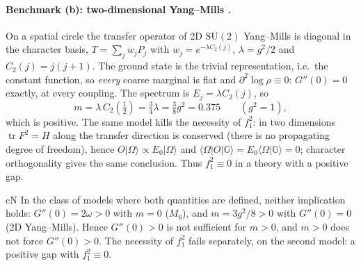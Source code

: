 \paragraph{Benchmark (b): two-dimensional Yang--Mills \LC.}
On a spatial circle the transfer operator of 2D $\mathrm{SU}(2)$ Yang--Mills is diagonal in the
character basis, $T=\sum_j w_jP_j$ with $w_j=e^{-\lambda C_2(j)}$, $\lambda=g^2/2$ and
$C_2(j)=j(j+1)$. The ground state is the trivial representation, i.e.\ the constant function, so
\emph{every} coarse marginal is flat and $\partial^2\log\rho\equiv0$: $G''(0)=0$ exactly, at every
coupling. The spectrum is $E_j=\lambda C_2(j)$, so
\begin{equation}
m=\lambda\,C_2(\tfrac12)=\tfrac34\lambda=\tfrac38g^2=0.375\qquad(g^2=1),
\label{eq:ng-2dym}
\end{equation}
which is positive. The same model kills the necessity of $f_1^2$: in two dimensions
$\operatorname{tr}F^2=H$ along the transfer direction is conserved (there is no propagating degree of
freedom), hence $O|\Omega\rangle\propto E_0|\Omega\rangle$ and
$\langle\Omega|O|\mathbb G\rangle=E_0\langle\Omega|\mathbb G\rangle=0$; character orthogonality gives
the same conclusion. Thus $f_1^2\equiv0$ in a theory with a positive gap.

\begin{claimbox}{cN}
\label{cor:ng-sep}
In the class of models where both quantities are defined, neither implication holds:
$G''(0)=2\omega>0$ with $m=0$ ($M_6$), and $m=3g^2/8>0$ with $G''(0)=0$ (2D Yang--Mills).
Hence $G''(0)>0$ is not sufficient for $m>0$, and $m>0$ does not force $G''(0)>0$. The necessity
of $f_1^2$ fails separately, on the second model: a positive gap with $f_1^2\equiv0$.
\end{claimbox}

